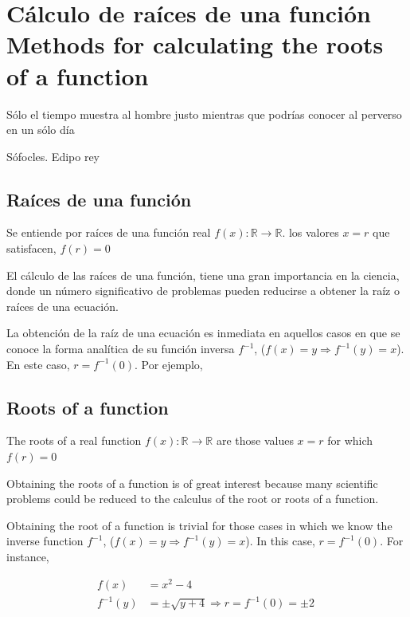 \chapter{Cálculo de raíces de una función\\ Methods for calculating the roots of a function }
\epigraph{Sólo el tiempo muestra al hombre justo mientras que podrías conocer al perverso en un sólo día}{Sófocles. Edipo rey}

\begin{paracol}{2}
\section{Raíces de una función}
Se entiende por raíces de una función real $f(x):\mathbb{R} \rightarrow \mathbb{R}$. los valores $x=r$ que satisfacen, $f(r)=0$

El cálculo de las raíces de una función, tiene una gran importancia en la ciencia, donde un número significativo de problemas pueden reducirse a obtener la raíz o raíces de una ecuación.

La obtención de la raíz de una ecuación es inmediata en aquellos casos en que se conoce la forma analítica de su función inversa $f^{-1}$, ($f(x)=y\Rightarrow f^{-1}(y)=x$). En este caso, $r=f^{-1}(0)$. Por ejemplo,
\switchcolumn
\section{Roots of a function}
The roots of a real function $f(x):\mathbb{R} \rightarrow \mathbb{R}$ are those values $x = r $ for which $f(r) = 0$

Obtaining the roots of a function is of great interest because many scientific problems could be reduced to the calculus of the root or roots of a function.

Obtaining the root of a function is trivial for those cases in which we know the inverse function $f^{-1}$, ($f(x)=y\Rightarrow f^{-1}(y)=x$). In this case, $r=f^{-1}(0)$. For instance,  
\end{paracol}

\begin{align*}
f(x)&=x^2-4\\
f^{-1}(y)&=\pm\sqrt{y+4}\Rightarrow r=f^{-1}(0)=\pm 2\
\end{align*}

